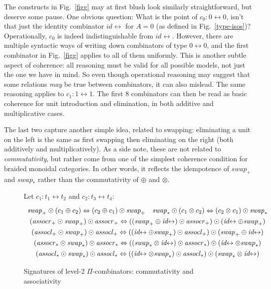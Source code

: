 \documentclass{article}
\newcommand{\swapp}{\ensuremath{\mathit{swap}_+}}
\newcommand{\assoclp}{\ensuremath{\mathit{assocl}_+}}
\newcommand{\assocrp}{\ensuremath{\mathit{assocr}_+}}
\newcommand{\swapt}{\ensuremath{\mathit{swap}_*}}
\newcommand{\assoclt}{\ensuremath{\mathit{assocl}_*}}
\newcommand{\assocrt}{\ensuremath{\mathit{assocr}_*}}
\newcommand{\idc}{\mathit{id}\!\!\leftrightarrow}
\begin{document}
The constructs in Fig.~\ref{figg} may at first blush look similarly straightforward,
but deserve some pause. One obvious question: What is the point of
$c_0 : 0 \leftrightarrow 0$, isn't that just the identity combinator $\idc$
for $A = 0$ (as defined in Fig.~\ref{type-isos})? Operationally, $c_0$
is indeed indistinguishable from $\idc$. However, there are multiple syntactic
ways of writing down combinators of type $0 \leftrightarrow 0$, and the
first combinator in Fig.~\ref{figg} applies to all of them uniformly.
This is another subtle aspect of coherence: all reasoning must be valid for
all possible models, not just the one we have in mind. So even though
operational reasoning may suggest that some relations \emph{may} be
true between combinators, it can also mislead. The same reasoning
applies to $c_1 : 1 \leftrightarrow 1$.  The first $8$ combinators can
then be read as basic coherence for unit introduction and elimination,
in both additive and multiplicative cases.

The last two capture
another simple idea, related to swapping: eliminating a unit
on the left is the same as first swapping then eliminating on the
right (both additively and multiplicatively). As a side note,
these are not related to \emph{commutativity}, but rather
come from one of the simplest coherence condition for
braided monoidal categories. In other words, it reflects the
idempotence of $\swapp$ and $\swapt$ rather than the
commutativity of $\oplus$ and $\otimes$.

\begin{figure}[t]
Let $c_1 : t_1 \leftrightarrow t_2$ and $c_2 : t_3 \leftrightarrow t_4$:
\[\def\arraystretch{1.3}
\begin{array}{c}
  {\swapp \odot (c_1 \oplus c_2) \Leftrightarrow (c_2 \oplus c_1) \odot \swapp}
\quad
  {\swapt \odot (c_1 \otimes c_2) \Leftrightarrow (c_2 \otimes c_1) \odot \swapt}
\\
  {(\assocrp \odot \swapp) \odot \assocrp \Leftrightarrow ((\swapp \oplus \idc) \odot \assocrp) \odot (\idc \oplus \swapp)}
\\
  {(\assoclp \odot \swapp) \odot \assoclp \Leftrightarrow ((\idc \oplus \swapp) \odot \assoclp) \odot (\swapp \oplus \idc)}
\\
  {(\assocrt \odot \swapt) \odot \assocrt \Leftrightarrow ((\swapt \otimes \idc) \odot \assocrt) \odot (\idc \otimes \swapt)}
\\
  {(\assoclt \odot \swapt) \odot \assoclt \Leftrightarrow ((\idc \otimes \swapt) \odot \assoclt) \odot (\swapt \otimes \idc)}
\end{array}\]
\caption{\label{figf}Signatures of level-2 $\Pi$-combinators: commutativity and associativity}
\end{figure}
\end{document}
